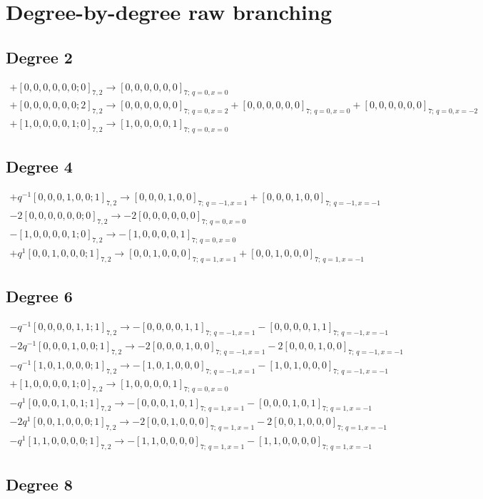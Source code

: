 \documentclass{article}
\begin{document}
\section{Degree-by-degree raw branching}
\subsection*{Degree 2}
\[\begin{gathered} +[0,0,0,0,0,0;0]_{7,2}\longrightarrow [0,0,0,0,0,0]_{7;\,q=0,x=0}\\+[0,0,0,0,0,0;2]_{7,2}\longrightarrow [0,0,0,0,0,0]_{7;\,q=0,x=2} +[0,0,0,0,0,0]_{7;\,q=0,x=0} +[0,0,0,0,0,0]_{7;\,q=0,x=-2}\\+[1,0,0,0,0,1;0]_{7,2}\longrightarrow [1,0,0,0,0,1]_{7;\,q=0,x=0}\end{gathered}\]\subsection*{Degree 4}
\[\begin{gathered} +q^{-1}[0,0,0,1,0,0;1]_{7,2}\longrightarrow [0,0,0,1,0,0]_{7;\,q=-1,x=1} +[0,0,0,1,0,0]_{7;\,q=-1,x=-1}\\-2[0,0,0,0,0,0;0]_{7,2}\longrightarrow -2[0,0,0,0,0,0]_{7;\,q=0,x=0}\\-[1,0,0,0,0,1;0]_{7,2}\longrightarrow -[1,0,0,0,0,1]_{7;\,q=0,x=0}\\+q^{1}[0,0,1,0,0,0;1]_{7,2}\longrightarrow [0,0,1,0,0,0]_{7;\,q=1,x=1} +[0,0,1,0,0,0]_{7;\,q=1,x=-1}\end{gathered}\]\subsection*{Degree 6}
\[\begin{gathered} -q^{-1}[0,0,0,0,1,1;1]_{7,2}\longrightarrow -[0,0,0,0,1,1]_{7;\,q=-1,x=1} -[0,0,0,0,1,1]_{7;\,q=-1,x=-1}\\-2q^{-1}[0,0,0,1,0,0;1]_{7,2}\longrightarrow -2[0,0,0,1,0,0]_{7;\,q=-1,x=1} -2[0,0,0,1,0,0]_{7;\,q=-1,x=-1}\\-q^{-1}[1,0,1,0,0,0;1]_{7,2}\longrightarrow -[1,0,1,0,0,0]_{7;\,q=-1,x=1} -[1,0,1,0,0,0]_{7;\,q=-1,x=-1}\\+[1,0,0,0,0,1;0]_{7,2}\longrightarrow [1,0,0,0,0,1]_{7;\,q=0,x=0}\\-q^{1}[0,0,0,1,0,1;1]_{7,2}\longrightarrow -[0,0,0,1,0,1]_{7;\,q=1,x=1} -[0,0,0,1,0,1]_{7;\,q=1,x=-1}\\-2q^{1}[0,0,1,0,0,0;1]_{7,2}\longrightarrow -2[0,0,1,0,0,0]_{7;\,q=1,x=1} -2[0,0,1,0,0,0]_{7;\,q=1,x=-1}\\-q^{1}[1,1,0,0,0,0;1]_{7,2}\longrightarrow -[1,1,0,0,0,0]_{7;\,q=1,x=1} -[1,1,0,0,0,0]_{7;\,q=1,x=-1}\end{gathered}\]\subsection*{Degree 8}
\end{document}
